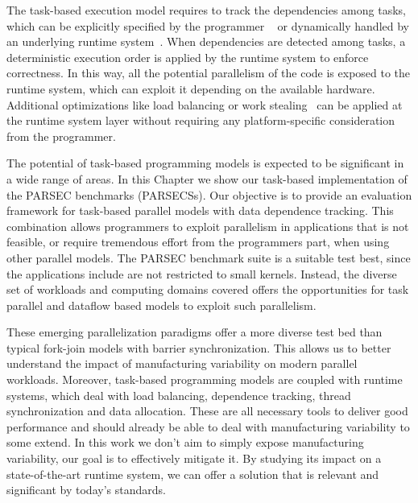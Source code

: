 The task-based execution model requires to track the dependencies among tasks, which can
be explicitly specified by the programmer
~\cite{Jenista:2011:OSO:2038037.1941563,Zuckerman:2011:UCP:2000417.2000424} or dynamically
handled by an underlying runtime
system~\cite{DuranIJPP09,Tzenakis:2012:BBD:2370036.2145864,Duran:PPL2011}.  When
dependencies are detected among tasks, a deterministic execution order is applied by the
runtime system to enforce correctness.  In this way, all the potential parallelism of the
code is exposed to the runtime system, which can exploit it depending on the available
hardware.  Additional optimizations like load balancing or work
stealing~\cite{Blumofe1995,Duran:PPL2011} can be applied at the runtime system layer
without requiring any platform-specific consideration from the programmer. 

The potential of task-based programming models is expected to be significant in a wide
range of areas.  In this Chapter we show our task-based implementation of the PARSEC
benchmarks (PARSECSs).  Our objective is to provide an evaluation framework for task-based
parallel models with data dependence tracking.  This combination allows programmers to
exploit parallelism in applications that is not feasible, or require tremendous effort
from the programmers part, when using other parallel models.  The PARSEC benchmark suite 
is a suitable test best, since the applications include are not restricted to small 
kernels.  Instead, the diverse set of workloads and computing domains covered offers the
opportunities for task parallel and dataflow based models to exploit such parallelism.  

These emerging parallelization paradigms offer a more diverse test bed than typical
fork-join models with barrier synchronization.  This allows us to better understand the
impact of manufacturing variability on modern parallel workloads.  Moreover, task-based
programming models are coupled with runtime systems, which deal with load balancing,
dependence tracking, thread synchronization and data allocation.  These are all necessary
tools to deliver good performance and should already be able to deal with manufacturing
variability to some extend.  In this work we don't aim to simply expose manufacturing
variability, our goal is to effectively mitigate it.  By studying its impact on a state-of-the-art 
runtime system, we can offer a solution that is relevant and significant by today's
standards.    
